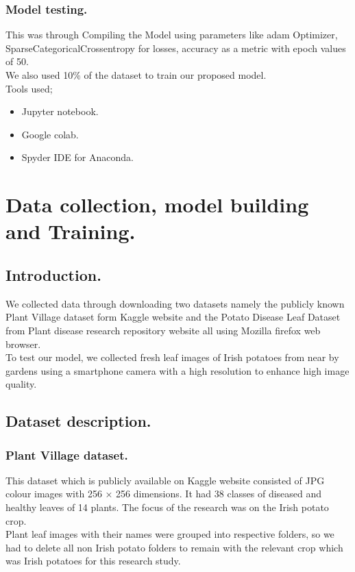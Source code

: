 \documentclass[11pt]{report}
\begin{document}
\subsection{Model testing.}
This was through Compiling the Model using parameters like adam Optimizer, SparseCategoricalCrossentropy
for losses, accuracy as a metric with epoch values of 50.\\
We also used 10\% of the dataset to train our proposed model.\\

Tools used;
\begin{itemize}
	\item Jupyter notebook.
	\item Google colab.
	\item Spyder IDE for Anaconda.
\end{itemize}

\newpage
\chapter{Data collection, model building and Training.}
\section{Introduction.}
We collected data through downloading two datasets namely the publicly known Plant Village dataset form Kaggle website and the Potato Disease Leaf Dataset from Plant disease research repository website all using Mozilla firefox web browser.\\

To test our model, we collected fresh leaf images of Irish potatoes from near by gardens using a smartphone camera with a high resolution to enhance high image quality.\\

\section{Dataset description.} 
\subsection{Plant Village dataset.}
This dataset which is publicly available on Kaggle website consisted of JPG colour images with 256 × 256 dimensions. It had 38 classes of diseased and healthy leaves
of 14 plants. The focus of the research was on the Irish potato crop.\\
Plant leaf images with their names were grouped into respective folders, so we had to delete all non Irish potato folders to  remain with the relevant crop which was Irish potatoes for this research study.\\
\end{document}
